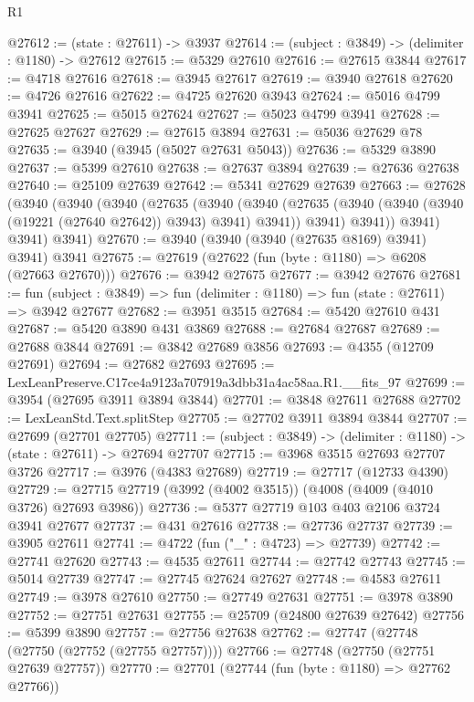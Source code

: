 \begin{lexlean}{R1}
\begin{coremodule}
@27612 := (state : @27611) -> @3937
@27614 := (subject : @3849) -> (delimiter : @1180) -> @27612
@27615 := @5329 @27610
@27616 := @27615 @3844
@27617 := @4718 @27616
@27618 := @3945 @27617
@27619 := @3940 @27618
@27620 := @4726 @27616
@27622 := @4725 @27620 @3943
@27624 := @5016 @4799 @3941
@27625 := @5015 @27624
@27627 := @5023 @4799 @3941
@27628 := @27625 @27627
@27629 := @27615 @3894
@27631 := @5036 @27629 @78
@27635 := @3940 (@3945 (@5027 @27631 @5043))
@27636 := @5329 @3890
@27637 := @5399 @27610
@27638 := @27637 @3894
@27639 := @27636 @27638
@27640 := @25109 @27639
@27642 := @5341 @27629 @27639
@27663 := @27628
    (@3940
      (@3940
        (@3940
          (@27635
            (@3940
              (@3940
                (@27635 (@3940 (@3940 (@3940 (@19221 (@27640 @27642)) @3943) @3941) @3941))
                @3941)
              @3941))
          @3941)
        @3941)
      @3941)
@27670 := @3940 (@3940 (@3940 (@27635 @8169) @3941) @3941) @3941
@27675 := @27619 (@27622 (fun (byte : @1180) => @6208 (@27663 @27670)))
@27676 := @3942 @27675
@27677 := @3942 @27676
@27681 := fun (subject : @3849) => fun (delimiter : @1180) => fun (state : @27611) => @3942 @27677
@27682 := @3951 @3515
@27684 := @5420 @27610 @431
@27687 := @5420 @3890 @431 @3869
@27688 := @27684 @27687
@27689 := @27688 @3844
@27691 := @3842 @27689 @3856
@27693 := @4355 (@12709 @27691)
@27694 := @27682 @27693
@27695 := LexLeanPreserve.C17ce4a9123a707919a3dbb31a4ac58aa.R1.__fits_97
@27699 := @3954 (@27695 @3911 @3894 @3844)
@27701 := @3848 @27611 @27688
@27702 := LexLeanStd.Text.splitStep
@27705 := @27702 @3911 @3894 @3844
@27707 := @27699 (@27701 @27705)
@27711 := (subject : @3849) -> (delimiter : @1180) -> (state : @27611) -> @27694 @27707
@27715 := @3968 @3515 @27693 @27707 @3726
@27717 := @3976 (@4383 @27689)
@27719 := @27717 (@12733 @4390)
@27729 := @27715 @27719 (@3992 (@4002 @3515)) (@4008 (@4009 (@4010 @3726) @27693 @3986))
@27736 := @5377 @27719 @103 @403 @2106 @3724 @3941 @27677
@27737 := @431 @27616
@27738 := @27736 @27737
@27739 := @3905 @27611
@27741 := @4722 (fun ("_" : @4723) => @27739)
@27742 := @27741 @27620
@27743 := @4535 @27611
@27744 := @27742 @27743
@27745 := @5014 @27739
@27747 := @27745 @27624 @27627
@27748 := @4583 @27611
@27749 := @3978 @27610
@27750 := @27749 @27631
@27751 := @3978 @3890
@27752 := @27751 @27631
@27755 := @25709 (@24800 @27639 @27642)
@27756 := @5399 @3890
@27757 := @27756 @27638
@27762 := @27747 (@27748 (@27750 (@27752 (@27755 @27757))))
@27766 := @27748 (@27750 (@27751 @27639 @27757))
@27770 := @27701 (@27744 (fun (byte : @1180) => @27762 @27766))

\end{coremodule}
\end{lexlean}

